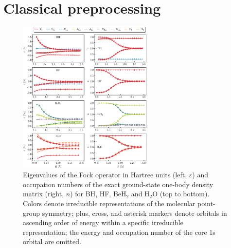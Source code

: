 \documentclass[aps,pra,twocolumn]{revtex4-2}
\begin{document}
\section{Classical preprocessing}
\label{sec:classical}

\begin{figure}[t!]
\includegraphics[width=0.6\textwidth]{../figures/scf_fci/scf_fci.eps}
\caption{Eigenvalues of the Fock operator in Hartree units (left, $\varepsilon$) and occupation numbers of the exact ground-state one-body density matrix (right, $n$) 
for BH, HF, BeH$_2$ and H$_2$O (top to bottom). 
Colors denote irreducible representations of the molecular point-group symmetry;
plus, cross, and asterisk markers denote orbitals in ascending order of energy within a specific irreducible representation;
the energy and occupation number of the core 1s orbital are omitted.}
\label{figure:scf}
\end{figure}



\end{document}
